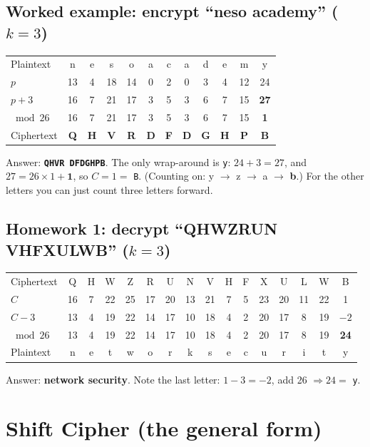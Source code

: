 \documentclass[10pt,a4paper]{article}
\newcommand{\hl}[1]{\cellcolor{warn!18}\textbf{#1}}
\newcommand{\ttx}[1]{\texttt{#1}}
\begin{document}
\subsection{Worked example: encrypt ``neso academy'' ($k=3$)}
\begin{center}\small\setlength{\tabcolsep}{5pt}
\begin{tabular}{@{}l*{4}{c}|*{7}{c}@{}}
\toprule
Plaintext & n&e&s&o & a&c&a&d&e&m&y\\
$p$ & 13&4&18&14 & 0&2&0&3&4&12&24\\
$p+3$ & 16&7&21&17 & 3&5&3&6&7&15&\hl{27}\\
$\bmod 26$ & 16&7&21&17 & 3&5&3&6&7&15&\hl{1}\\
Ciphertext & \textbf{Q}&\textbf{H}&\textbf{V}&\textbf{R} & \textbf{D}&\textbf{F}&\textbf{D}&\textbf{G}&\textbf{H}&\textbf{P}&\textbf{B}\\
\bottomrule
\end{tabular}
\end{center}
Answer: \textbf{\ttx{QHVR DFDGHPB}}.
The only wrap-around is \ttx{y}: $24+3 = 27$, and $27 = 26\times 1 + \mathbf{1}$, so $C = 1 = $ \ttx{B}.
(Counting on: y $\to$ z $\to$ a $\to$ \textbf{b}.) For the other letters you can just count three letters forward.

\subsection{Homework 1: decrypt ``QHWZRUN VHFXULWB'' ($k=3$)}
\begin{center}\small\setlength{\tabcolsep}{3.6pt}
\begin{tabular}{@{}l*{7}{c}|*{8}{c}@{}}
\toprule
Ciphertext & Q&H&W&Z&R&U&N & V&H&F&X&U&L&W&B\\
$C$ & 16&7&22&25&17&20&13 & 21&7&5&23&20&11&22&1\\
$C-3$ & 13&4&19&22&14&17&10 & 18&4&2&20&17&8&19&\hl{$-2$}\\
$\bmod 26$ & 13&4&19&22&14&17&10 & 18&4&2&20&17&8&19&\hl{24}\\
Plaintext & n&e&t&w&o&r&k & s&e&c&u&r&i&t&y\\
\bottomrule
\end{tabular}
\end{center}
Answer: \textbf{network security}. Note the last letter: $1-3=-2$, add 26 $\Rightarrow 24 =$ \ttx{y}.

\section{Shift Cipher (the general form)}
\end{document}
